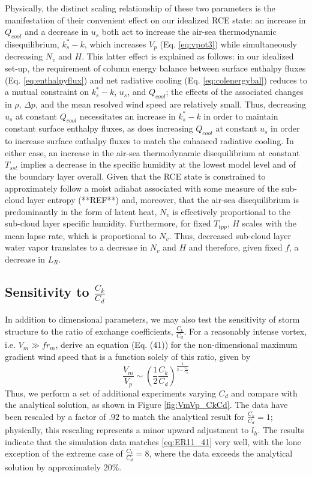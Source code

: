 \documentclass[12pt]{article}
\begin{document}
Physically, the distinct scaling relationship of these two parameters is the manifestation of their convenient effect on our idealized RCE state: an increase in $Q_{cool}$ and a decrease in $u_s$ both act to increase the air-sea thermodynamic disequilibrium, $k^*_s-k$, which increases $V_p$ (Eq.  \eqref{eq:vpot3}) while simultaneously decreasing $N_v$ and $H$.  This latter effect is explained as follows: in our idealized set-up, the requirement of column energy balance between surface enthalpy fluxes (Eq. \eqref{eq:enthalpyflux}) and net radiative cooling (Eq. \eqref{eq:colenergybal}) reduces to a mutual constraint on $k^*_s-k$, $u_s$,  and $Q_{cool}$; the effects of the associated changes in $\rho$, $\Delta p$, and the mean resolved wind speed are relatively small. Thus, decreasing $u_s$ at constant $Q_{cool}$ necessitates an increase in $k^*_s-k$ in order to maintain constant surface enthalpy fluxes, as does increasing $Q_{cool}$ at constant $u_s$ in order to increase surface enthalpy fluxes to match the enhanced radiative cooling.  In either case, an increase in the air-sea thermodynamic disequilibrium at constant $T_{sst}$ implies a decrease in the specific humidity at the lowest model level and of the boundary layer overall.  Given that the RCE state is constrained to approximately follow a moist adiabat associated with some measure of the sub-cloud layer entropy (**REF**) and, moreover, that the air-sea disequilibrium is predominantly in the form of latent heat, $N_v$ is effectively proportional to the sub-cloud layer specific humidity. Furthermore, for fixed $T_{tpp}$, $H$ scales with the mean lapse rate, which is proportional to $N_v$.  Thus, decreased sub-cloud layer water vapor translates to a decrease in $N_v$ and $H$ and therefore, given fixed $f$, a decrease in $L_R$.


\subsection{Sensitivity to $\frac{C_k}{C_d}$}
In addition to dimensional parameters, we may also test the sensitivity of storm structure to the ratio of exchange coefficients, $\frac{C_k}{C_d}$.  For a reasonably intense vortex, i.e. $V_m \gg fr_m$, \cite{Emanuel_Rotunno_2011} derive an equation (Eq. (41)) for the non-dimensional maximum gradient wind speed that is a function solely of this ratio, given by
\begin{equation}
\label{eq:ER11_41}
\frac{V_m}{V_p} \sim \left(\frac{1}{2}\frac{C_k}{C_d}\right)^\frac{1}{2-\frac{C_k}{C_d}}
\end{equation}
Thus, we perform a set of additional experiments varying $C_d$ and compare with the analytical solution, as shown in Figure \ref{fig:VmVp_CkCd}. The data have been rescaled by a factor of $.92$ to match the analytical result for $\frac{C_k}{C_d} = 1$; physically, this rescaling represents a minor upward adjustment to $l_h$. The results indicate that the simulation data matches  \eqref{eq:ER11_41} very well, with the lone exception of the extreme case of $\frac{C_k}{C_d} = 8$, where the data exceeds the analytical solution by approximately 20\%.
\end{document}
